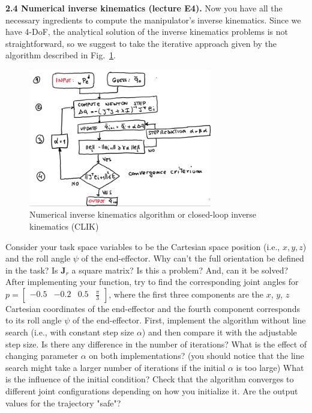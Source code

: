 \documentclass[11pt]{article}
\begin{document}
\textbf{2.4 Numerical inverse kinematics (lecture E4).} Now you have all the necessary ingredients to compute the manipulator's inverse kinematics. Since we have 4-DoF, the analytical solution of the inverse kinematics problems is not straightforward, so we suggest to take the iterative approach given by the algorithm described in Fig.~\ref{fig:CLIK}. 
%
\begin{figure}[bht]
	\centering
	\includegraphics[width=8cm]{pics/flow_chart.png}
	\caption{Numerical inverse kinematics algorithm or closed-loop inverse kinematics (CLIK)}
	\label{fig:CLIK}
\end{figure}
%
Consider your task space variables to be the Cartesian space position (i.e., $x,y,z$) and the roll angle $\psi$ of the end-effector. 
Why can't the full orientation be defined in the task?
Is $\mathbf{J}_r$ a square matrix? Is this a problem? And, can it be solved? After implementing your function, try to find the corresponding joint angles for $p = \begin{bmatrix}
	-0.5 & -0.2 & 0.5 & \frac{\pi}{3}
\end{bmatrix}$, where the first three components are the $x$, $y$, $z$ Cartesian coordinates of the end-effector and the fourth component corresponds to its roll angle $\psi$ of the end-effector.
First, implement the algorithm without line search (i.e., with constant step size $\alpha$) and then compare it with the adjustable step size. Is there any difference in the number of iterations? What is the effect of changing parameter $\alpha$ on both implementations? (you should notice that the line search might take a larger number of iterations if the initial $\alpha$ is too large) What is the influence of the initial condition?
Check that the algorithm converges to different joint configurations depending on how you initialize it.  Are the output values for the trajectory "safe"?  
\end{document}
